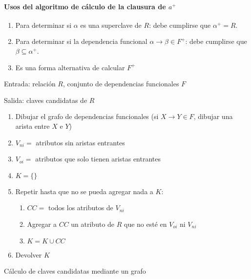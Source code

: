 \documentclass[a4paper, twoside]{article}
\begin{document}
\paragraph{Usos del algoritmo de cálculo de la clausura de $a^{+}$}
\begin{enumerate}
	\item Para determinar si $\alpha$ es una superclave de $R$: debe cumplirse que $\alpha^{+}=R$.
	\item Para determinar si la dependencia funcional $\alpha\to\beta\in F^{+}$: debe cumplirse que $\beta\subseteq\alpha^{+}$.
	\item Es una forma alternativa de calcular $F^{+}$
\end{enumerate}

\begin{algorithm}[H]
	Entrada: relación $R$, conjunto de dependencias funcionales $F$

	Salida: claves candidatas de $R$
	\begin{enumerate}
		\item Dibujar el grafo de dependencias funcionales (si $X\to Y\in F$, dibujar una arista entre $X$ e $Y$)
		\item $V_{ni}=$ atributos sin aristas entrantes
		\item $V_{oi}=$ atributos que solo tienen aristas entrantes
		\item $K=\{\}$
		\item Repetir hasta que no se pueda agregar nada a $K$:
		\begin{enumerate}
			\item $CC=$ todos los atributos de $V_{ni}$
			\item Agregar a $CC$ un atributo de $R$ que no esté en $V_{oi}$ ni $V_{ni}$
			\item $K=K\cup CC$
		\end{enumerate}
		\item Devolver $K$
	\end{enumerate}
	\caption{Cálculo de claves candidatas mediante un grafo}
\end{algorithm}
\end{document}
